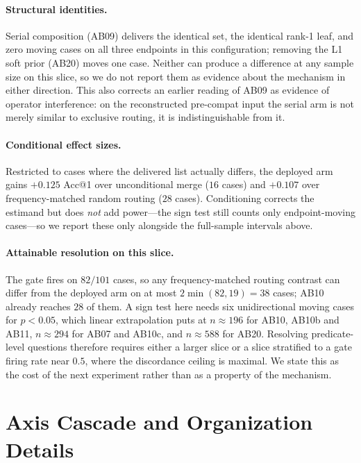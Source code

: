 \paragraph{Structural identities.}
Serial composition (AB09) delivers the identical set, the identical rank-1 leaf, and zero moving cases on all three endpoints in this configuration; removing the L1 soft prior (AB20) moves one case.
Neither can produce a difference at any sample size on this slice, so we do not report them as evidence about the mechanism in either direction.
This also corrects an earlier reading of AB09 as evidence of operator interference: on the reconstructed pre-compat input the serial arm is not merely similar to exclusive routing, it is indistinguishable from it.

\paragraph{Conditional effect sizes.}
Restricted to cases where the delivered list actually differs, the deployed arm gains $+0.125$ Acc@1 over unconditional merge ($16$ cases) and $+0.107$ over frequency-matched random routing ($28$ cases).
Conditioning corrects the estimand but does \emph{not} add power---the sign test still counts only endpoint-moving cases---so we report these only alongside the full-sample intervals above.

\paragraph{Attainable resolution on this slice.}
The gate fires on $82/101$ cases, so any frequency-matched routing contrast can differ from the deployed arm on at most $2\min(82,19)=38$ cases; AB10 already reaches $28$ of them.
A sign test here needs six unidirectional moving cases for $p<0.05$, which linear extrapolation puts at $n\approx196$ for AB10, AB10b and AB11, $n\approx294$ for AB07 and AB10c, and $n\approx588$ for AB20.
Resolving predicate-level questions therefore requires either a larger slice or a slice stratified to a gate firing rate near $0.5$, where the discordance ceiling is maximal.
We state this as the cost of the next experiment rather than as a property of the mechanism.

\section{Axis Cascade and Organization Details}
\label{app:org-axis}

